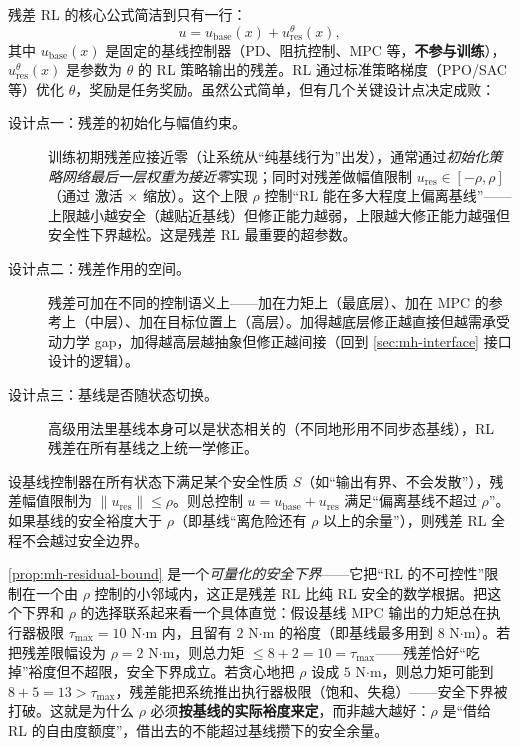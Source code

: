 残差 RL 的核心公式简洁到只有一行：
\begin{equation}
  u=u_{\text{base}}(x)+u_{\text{res}}^{\theta}(x),
  \label{eq:mh-residual}
\end{equation}
其中 $u_{\text{base}}(x)$ 是固定的基线控制器（PD、阻抗控制、MPC 等，\textbf{不参与训练}），$u_{\text{res}}^{\theta}(x)$ 是参数为 $\theta$ 的 RL 策略输出的残差。RL 通过标准策略梯度（PPO/SAC 等\cite{levine2018reinforcement}）优化 $\theta$，奖励是任务奖励。虽然公式简单，但有几个关键设计点决定成败：
\begin{description}
  \item[设计点一：残差的初始化与幅值约束。] 训练初期残差应接近零（让系统从“纯基线行为”出发），通常通过\emph{初始化策略网络最后一层权重为接近零}实现；同时对残差做幅值限制 $u_{\text{res}}\in[-\rho,\rho]$（通过 \verb@tanh@ 激活 $\times$ 缩放）。这个上限 $\rho$ 控制“RL 能在多大程度上偏离基线”——上限越小越安全（越贴近基线）但修正能力越弱，上限越大修正能力越强但安全性下界越松。这是残差 RL 最重要的超参数。
  \item[设计点二：残差作用的空间。] 残差可加在不同的控制语义上——加在力矩上（最底层）、加在 MPC 的参考上（中层）、加在目标位置上（高层）。加得越底层修正越直接但越需承受动力学 gap，加得越高层越抽象但修正越间接（回到 \cref{sec:mh-interface} 接口设计的逻辑）。
  \item[设计点三：基线是否随状态切换。] 高级用法里基线本身可以是状态相关的（不同地形用不同步态基线），RL 残差在所有基线之上统一学修正。
\end{description}

\begin{proposition}[残差 RL 的安全性下界]\label{prop:mh-residual-bound}
设基线控制器在所有状态下满足某个安全性质 $S$（如“输出有界、不会发散”），残差幅值限制为 $\|u_{\text{res}}\|\le\rho$。则总控制 $u=u_{\text{base}}+u_{\text{res}}$ 满足“偏离基线不超过 $\rho$”。如果基线的安全裕度大于 $\rho$（即基线“离危险还有 $\rho$ 以上的余量”），则残差 RL 全程不会越过安全边界。
\end{proposition}

\noindent\cref{prop:mh-residual-bound} 是一个\emph{可量化的安全下界}——它把“RL 的不可控性”限制在一个由 $\rho$ 控制的小邻域内，这正是残差 RL 比纯 RL 安全的数学根据。把这个下界和 $\rho$ 的选择联系起来看一个具体直觉：假设基线 MPC 输出的力矩总在执行器极限 $\tau_{\max}=10$ N$\cdot$m 内，且留有 $2$ N$\cdot$m 的裕度（即基线最多用到 $8$ N$\cdot$m）。若把残差限幅设为 $\rho=2$ N$\cdot$m，则总力矩 $\le8+2=10=\tau_{\max}$——残差恰好“吃掉”裕度但不超限，安全下界成立。若贪心地把 $\rho$ 设成 $5$ N$\cdot$m，则总力矩可能到 $8+5=13>\tau_{\max}$，残差能把系统推出执行器极限（饱和、失稳）——安全下界被打破。这就是为什么 $\rho$ 必须\textbf{按基线的实际裕度来定}，而非越大越好：$\rho$ 是“借给 RL 的自由度额度”，借出去的不能超过基线攒下的安全余量。

